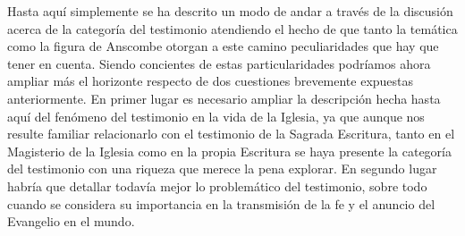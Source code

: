       Hasta aquí simplemente se ha descrito un modo de andar a través de la discusión
      acerca de la categoría del testimonio atendiendo el hecho de que tanto la
      temática como la figura de Anscombe otorgan a este camino peculiaridades que hay
      que tener en cuenta. Siendo concientes de estas particularidades podríamos ahora
      ampliar más el horizonte respecto de dos cuestiones brevemente expuestas
      anteriormente. En primer lugar es necesario ampliar la descripción hecha hasta
      aquí del fenómeno del testimonio en la vida de la Iglesia, ya que aunque nos
      resulte familiar relacionarlo con el testimonio de la Sagrada Escritura, tanto
      en el Magisterio de la Iglesia como en la propia Escritura se haya presente la
      categoría del testimonio con una riqueza que merece la pena explorar. En segundo
      lugar habría que detallar todavía mejor lo problemático del testimonio, sobre
      todo cuando se considera su importancia en la transmisión de la fe y el anuncio
      del Evangelio en el mundo.
